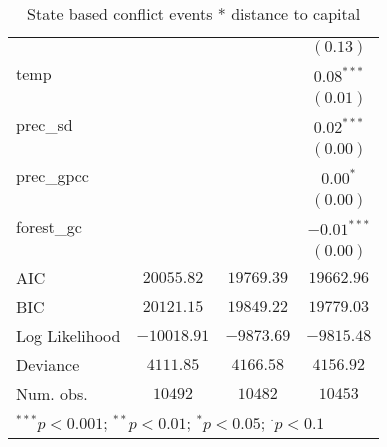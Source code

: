 \begin{sidewaystable}
\begin{center}
{\begin{tabular}{l c c c}
                     &               &               & $(0.13)$       \\
temp                 &               &               & $0.08^{***}$   \\
                     &               &               & $(0.01)$       \\
prec\_sd             &               &               & $0.02^{***}$   \\
                     &               &               & $(0.00)$       \\
prec\_gpcc           &               &               & $0.00^{*}$     \\
                     &               &               & $(0.00)$       \\
forest\_gc           &               &               & $-0.01^{***}$  \\
                     &               &               & $(0.00)$       \\
\hline
AIC                  & $20055.82$    & $19769.39$    & $19662.96$     \\
BIC                  & $20121.15$    & $19849.22$    & $19779.03$     \\
Log Likelihood       & $-10018.91$   & $-9873.69$    & $-9815.48$     \\
Deviance             & $4111.85$     & $4166.58$     & $4156.92$      \\
Num. obs.            & $10492$       & $10482$       & $10453$        \\
\hline
\multicolumn{4}{l}{\scriptsize{$^{***}p<0.001$; $^{**}p<0.01$; $^{*}p<0.05$; $^{\cdot}p<0.1$}}
\end{tabular}
}
\caption{State based conflict events *
		  distance to capital}
\label{interaction_state_based}
\end{center}
\end{sidewaystable}

